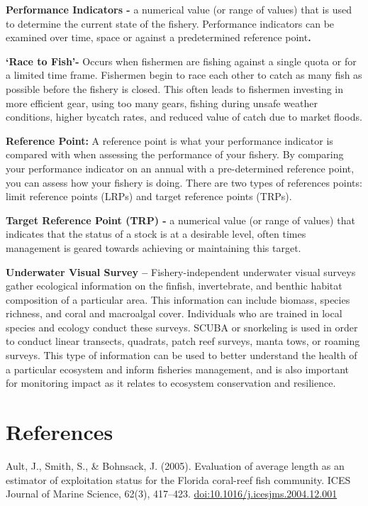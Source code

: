 \documentclass[]{book}
\begin{document}
\textbf{Performance Indicators -} a numerical value (or range of values)
that is used to determine the current state of the fishery. Performance
indicators can be examined over time, space or against a predetermined
reference point\textbf{.}

\textbf{`Race to Fish'-} Occurs when fishermen are fishing against a
single quota or for a limited time frame. Fishermen begin to race each
other to catch as many fish as possible before the fishery is closed.
This often leads to fishermen investing in more efficient gear, using
too many gears, fishing during unsafe weather conditions, higher bycatch
rates, and reduced value of catch due to market floods.

\textbf{Reference Point:} A reference point is what your performance
indicator is compared with when assessing the performance of your
fishery. By comparing your performance indicator on an annual with a
pre-determined reference point, you can assess how your fishery is
doing. There are two types of references points: limit reference points
(LRPs) and target reference points (TRPs).

\textbf{Target Reference Point (TRP) -} a numerical value (or range of
values) that indicates that the status of a stock is at a desirable
level, often times management is geared towards achieving or maintaining
this target.

\textbf{Underwater Visual Survey --} Fishery-independent underwater
visual surveys gather ecological information on the finfish,
invertebrate, and benthic habitat composition of a particular area. This
information can include biomass, species richness, and coral and
macroalgal cover. Individuals who are trained in local species and
ecology conduct these surveys. SCUBA or snorkeling is used in order to
conduct linear transects, quadrats, patch reef surveys, manta tows, or
roaming surveys. This type of information can be used to better
understand the health of a particular ecosystem and inform fisheries
management, and is also important for monitoring impact as it relates to
ecosystem conservation and resilience.

\chapter{References}\label{references}

Ault, J., Smith, S., \& Bohnsack, J. (2005). Evaluation of average
length as an estimator of exploitation status for the Florida coral-reef
fish community. ICES Journal of Marine Science, 62(3), 417--423.
\url{doi:10.1016/j.icesjms.2004.12.001}
\end{document}
